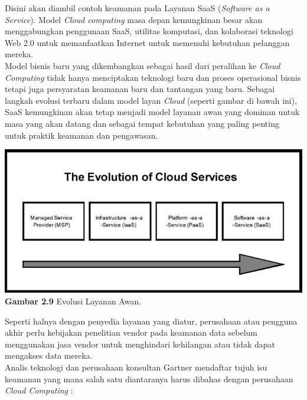 \tab Disini akan diambil contoh keamanan pada Layanan SaaS (\textit{Software as a Service}). Model \textit{Cloud computing} masa depan kemungkinan besar akan menggabungkan penggunaan SaaS, utilitas komputasi, dan kolaborasi teknologi Web 2.0 untuk memanfaatkan Internet untuk memenuhi  kebutuhan pelanggan mereka.\\
Model bisnis baru yang dikembangkan sebagai hasil dari peralihan ke \textit{Cloud Computing} tidak hanya menciptakan teknologi baru dan proses operasional bisnis tetapi juga persyaratan keamanan baru dan tantangan yang baru. Sebagai langkah evolusi terbaru dalam model layan \textit{Cloud} (seperti gambar di bawah ini), SaaS kemungkinan akan tetap menjadi model layanan awan yang dominan untuk masa yang akan datang dan sebagai tempat kebutuhan yang paling penting untuk praktik keamanan dan pengawasan.\\
\begin{center}
\includegraphics[scale=1]{gambar29.jpg} \\
\textbf{Gambar  2.9} Evolusi Layanan Awan. 
\end{center}
Seperti halnya dengan penyedia layanan yang diatur, perusahaan atau pengguna akhir perlu kebijakan penelitian vendor pada keamanan data sebelum menggunakan jasa vendor untuk menghindari  kehilangan atau tidak dapat mengakses data mereka.\\
Analis teknologi dan perusahaan konsultan Gartner mendaftar tujuh isu keamanan yang mana salah satu diantaranya  harus dibahas dengan perusahaan \textit{Cloud Computing} :\\
